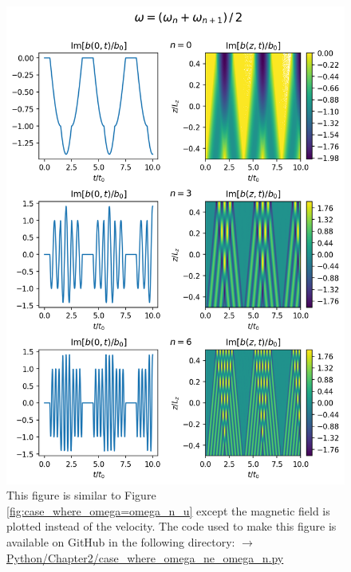 \begin{figure}
    \centering
    \vspace{-20pt}
    \includegraphics[width=\textwidth,height=0.9\textheight,keepaspectratio]{figures/chapter02/case_where_omega_ne_omega_n_b.png}
    \vspace{-10pt}
    \caption{This figure is similar to Figure \ref{fig:case_where_omega=omega_n_u} except the magnetic field is plotted instead of the velocity. The code used to make this figure is available on GitHub in the following directory:\newline
    \href{https://github.com/aleksyprok/apkp_thesis/blob/main/Python/Chapter2/case_where_omega_ne_omega_n.py}{$\rightarrow$ Python/Chapter2/case\_where\_omega\_ne\_omega\_n.py}}
    \vspace{-30pt}
    \label{fig:case_where_omega_ne_omega_n_b}
\end{figure}

